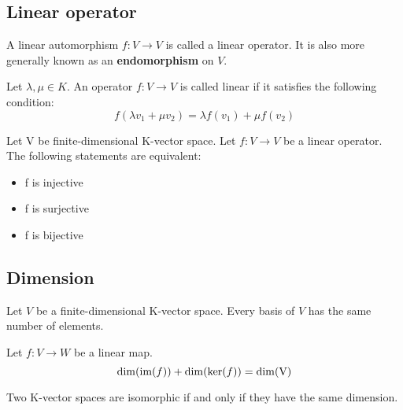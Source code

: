 	\subsection{Linear operator}
    	\begin{definition}
    	A linear automorphism $f: V \rightarrow V$ is called a linear operator. It is also more generally known as an \textbf{endomorphism} on $V$.
    \end{definition}
    	\begin{property}
			Let $\lambda, \mu \in K$. An operator $f: V \rightarrow V$ is called linear if it satisfies the following condition:
            \begin{equation}
				\label{linalgebra:operators:linearity}
                f(\lambda v_1 + \mu v_2) = \lambda f(v_1) + \mu f(v_2)
			\end{equation}
		\end{property}
        
        \begin{theorem}
			Let V be finite-dimensional K-vector space. Let $f:V\rightarrow V$ be a linear operator. The following statements are equivalent:
            \begin{itemize}
            	\item f is injective
				\item f is surjective
                \item f is bijective
			\end{itemize}
		\end{theorem}
        
	\subsection{Dimension}
        \begin{property}
			Let $V$ be a finite-dimensional K-vector space. Every basis of $V$ has the same number of elements.
		\end{property}
        \begin{theorem}
            Let $f: V \rightarrow W$ be a linear map.
            \begin{equation}
                \label{linalgebra:dimension_theorem}
                \dim(\text{\upshape im}(f)) + \dim(\text{\upshape ker}(f)) = \dim(\text{\upshape V})
            \end{equation}
        \end{theorem}
        \begin{theorem}
        	\label{linalgebra:isomorphic_dimension}
			Two K-vector spaces are isomorphic if and only if they have the same dimension.
		\end{theorem}
